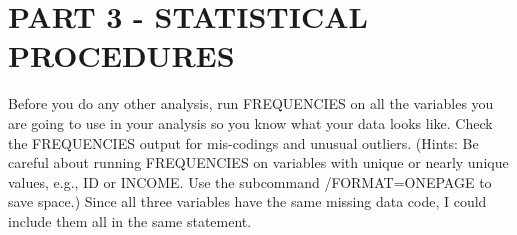 \section{PART 3 - STATISTICAL PROCEDURES}

Before you do any other analysis, run FREQUENCIES on all the variables you are going to use in your analysis so you know what your data looks like. Check the FREQUENCIES output for mis-codings and unusual outliers. (Hints: Be careful about running FREQUENCIES on variables with unique or nearly unique 
values, e.g., ID or INCOME. Use the subcommand /FORMAT=ONEPAGE to save space.)
Since all three variables have the same missing data code, I could include them all in the same statement.
